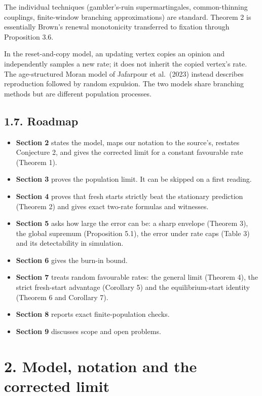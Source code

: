 \documentclass[
  british,
  11pt,
  a4paper,
]{article}
\providecommand{\tightlist}{%
  \setlength{\itemsep}{0pt}\setlength{\parskip}{0pt}}
\begin{document}
The individual techniques (gambler's-ruin supermartingales,
common-thinning couplings, finite-window branching approximations) are
standard. Theorem 2 is essentially Brown's renewal monotonicity
transferred to fixation through Proposition 3.6.

In the reset-and-copy model, an updating vertex copies an opinion and
independently samples a new rate; it does not inherit the copied
vertex's rate. The age-structured Moran model of Jafarpour et al.~(2023)
instead describes reproduction followed by random expulsion. The two
models share branching methods but are different population processes.

\subsection{1.7. Roadmap}\label{roadmap}

\begin{itemize}
\tightlist
\item
  \textbf{Section 2} states the model, maps our notation to the
  source's, restates Conjecture 2, and gives the corrected limit for a
  constant favourable rate (Theorem 1).
\item
  \textbf{Section 3} proves the population limit. It can be skipped on a
  first reading.
\item
  \textbf{Section 4} proves that fresh starts strictly beat the
  stationary prediction (Theorem 2) and gives exact two-rate formulas
  and witnesses.
\item
  \textbf{Section 5} asks how large the error can be: a sharp envelope
  (Theorem 3), the global supremum (Proposition 5.1), the error under
  rate caps (Table 3) and its detectability in simulation.
\item
  \textbf{Section 6} gives the burn-in bound.
\item
  \textbf{Section 7} treats random favourable rates: the general limit
  (Theorem 4), the strict fresh-start advantage (Corollary 5) and the
  equilibrium-start identity (Theorem 6 and Corollary 7).
\item
  \textbf{Section 8} reports exact finite-population checks.
\item
  \textbf{Section 9} discusses scope and open problems.
\end{itemize}

\section{2. Model, notation and the corrected
limit}\label{model-notation-and-the-corrected-limit}
\end{document}
